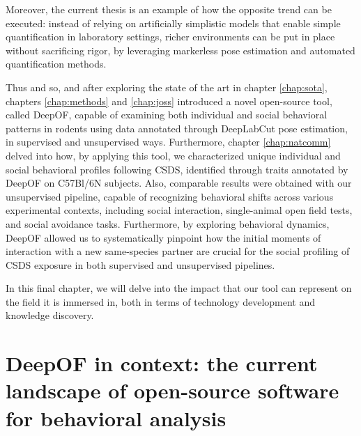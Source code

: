 Moreover, the current thesis is an example of how the opposite trend can be executed: instead of relying on artificially simplistic models that enable simple quantification in laboratory settings, richer environments can be put in place without sacrificing rigor, by leveraging markerless pose estimation and automated quantification methods.

Thus and so, and after exploring the state of the art in chapter \ref{chap:sota}, chapters \ref{chap:methods} and \ref{chap:joss} introduced a novel open-source tool, called DeepOF, capable of examining both individual and social behavioral patterns in rodents using data annotated through DeepLabCut pose estimation, in supervised and unsupervised ways. Furthermore, chapter \ref{chap:natcomm} delved into how, by applying this tool, we characterized unique individual and social behavioral profiles following CSDS, identified through traits annotated by DeepOF on C57Bl/6N subjects. Also, comparable results were obtained with our unsupervised pipeline, capable of recognizing behavioral shifts across various experimental contexts, including social interaction, single-animal open field tests, and social avoidance tasks. Furthermore, by exploring behavioral dynamics, DeepOF allowed us to systematically pinpoint how the initial moments of interaction with a new same-species partner are crucial for the social profiling of CSDS exposure in both supervised and unsupervised pipelines.

In this final chapter, we will delve into the impact that our tool can represent on the field it is immersed in, both in terms of technology development and knowledge discovery.

\section[DeepOF in context]{DeepOF in context: the current landscape of open-source software for behavioral analysis}

